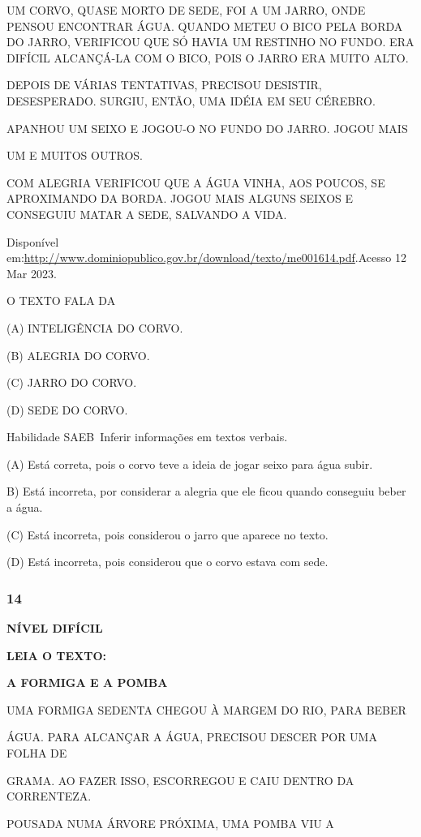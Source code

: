 UM CORVO, QUASE MORTO DE SEDE, FOI A UM JARRO, ONDE PENSOU ENCONTRAR
ÁGUA. QUANDO METEU O BICO PELA BORDA DO JARRO, VERIFICOU QUE SÓ HAVIA UM
RESTINHO NO FUNDO. ERA DIFÍCIL ALCANÇÁ-LA COM O BICO, POIS O JARRO ERA
MUITO ALTO.

DEPOIS DE VÁRIAS TENTATIVAS, PRECISOU DESISTIR, DESESPERADO. SURGIU,
ENTÃO, UMA IDÉIA EM SEU CÉREBRO.

APANHOU UM SEIXO E JOGOU-O NO FUNDO DO JARRO. JOGOU MAIS

UM E MUITOS OUTROS.

COM ALEGRIA VERIFICOU QUE A ÁGUA VINHA, AOS POUCOS, SE APROXIMANDO DA
BORDA. JOGOU MAIS ALGUNS SEIXOS E CONSEGUIU MATAR A SEDE, SALVANDO A
VIDA.

Disponível
em:\url{http://www.dominiopublico.gov.br/download/texto/me001614.pdf}.Acesso
12 Mar 2023.

O TEXTO FALA DA

(A) INTELIGÊNCIA DO CORVO.

(B) ALEGRIA DO CORVO.

(C) JARRO DO CORVO.

(D) SEDE DO CORVO.

Habilidade SAEB~Inferir informações em textos verbais.

\protect\hypertarget{_Hlk129586281}{}{}(\protect\hypertarget{_Hlk129420306}{}{}A)
Está correta, pois o corvo teve a ideia de jogar seixo para água subir.

B) Está incorreta, por considerar a alegria que ele ficou quando
conseguiu beber a água.

(C) Está incorreta, pois considerou o jarro que aparece no texto.

(D) Está incorreta, pois considerou que o corvo estava com sede.

\subsubsection{14}\label{section-140}

\textbf{NÍVEL DIFÍCIL}

\textbf{LEIA O TEXTO:}

\textbf{A FORMIGA E A POMBA}

UMA FORMIGA SEDENTA CHEGOU À MARGEM DO RIO, PARA BEBER

ÁGUA. PARA ALCANÇAR A ÁGUA, PRECISOU DESCER POR UMA FOLHA DE

GRAMA. AO FAZER ISSO, ESCORREGOU E CAIU DENTRO DA CORRENTEZA.

POUSADA NUMA ÁRVORE PRÓXIMA, UMA POMBA VIU A


